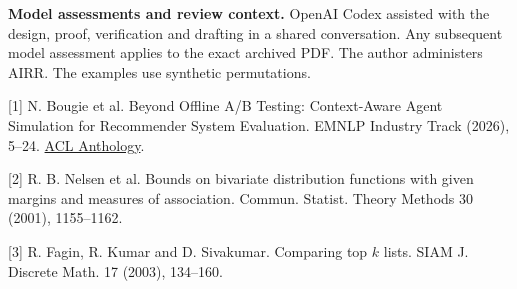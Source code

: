 \documentclass[11pt]{article}
\begin{document}
\textbf{Model assessments and review context.} OpenAI Codex assisted with the design, proof, verification and drafting in a shared conversation. Any subsequent model assessment applies to the exact archived PDF. The author administers AIRR. The examples use synthetic permutations.

\small
[1] N. Bougie et al. Beyond Offline A/B Testing: Context-Aware Agent Simulation for Recommender System Evaluation. EMNLP Industry Track (2026), 5--24. \href{https://aclanthology.org/2026.emnlp-industry.2/}{ACL Anthology}.

[2] R. B. Nelsen et al. Bounds on bivariate distribution functions with given margins and measures of association. Commun. Statist. Theory Methods 30 (2001), 1155--1162. 

[3] R. Fagin, R. Kumar and D. Sivakumar. Comparing top $k$ lists. SIAM J. Discrete Math. 17 (2003), 134--160.
\end{document}
